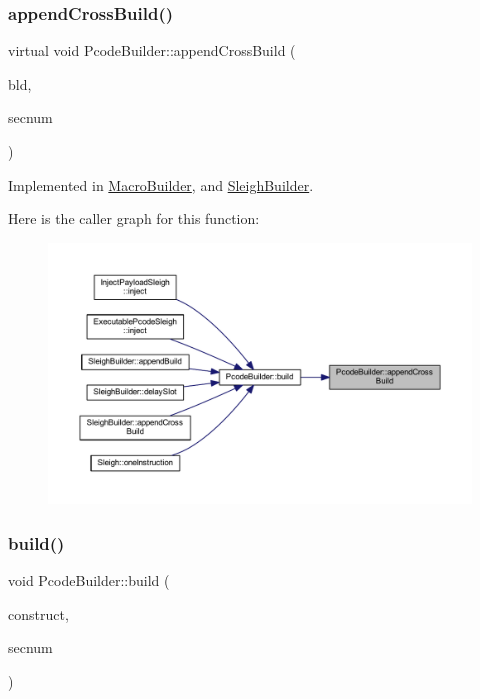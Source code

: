 \subsubsection{\texorpdfstring{appendCrossBuild()}{appendCrossBuild()}}
{\footnotesize\ttfamily virtual void Pcode\+Builder\+::append\+Cross\+Build (\begin{DoxyParamCaption}\item[{\mbox{\hyperlink{class_op_tpl}{Op\+Tpl}} $\ast$}]{bld,  }\item[{int4}]{secnum }\end{DoxyParamCaption})\hspace{0.3cm}{\ttfamily [pure virtual]}}



Implemented in \mbox{\hyperlink{class_macro_builder_a82c903d7c450eb1f5a503e85c4f8218f}{Macro\+Builder}}, and \mbox{\hyperlink{class_sleigh_builder_a343885f1c2044a04ae3587d121a968dd}{Sleigh\+Builder}}.

Here is the caller graph for this function\+:
\nopagebreak
\begin{figure}[H]
\begin{center}
\leavevmode
\includegraphics[width=350pt]{class_pcode_builder_ab8214b4b69aea45b459b1a37c1c2aa77_icgraph}
\end{center}
\end{figure}
\mbox{\label{class_pcode_builder_a0d27ac650805e617aa50c28da6d49c07}} 
\subsubsection{\texorpdfstring{build()}{build()}}
{\footnotesize\ttfamily void Pcode\+Builder\+::build (\begin{DoxyParamCaption}\item[{\mbox{\hyperlink{class_construct_tpl}{Construct\+Tpl}} $\ast$}]{construct,  }\item[{int4}]{secnum }\end{DoxyParamCaption})}



